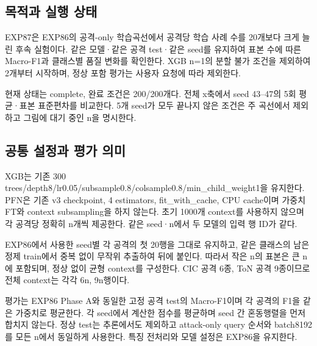 

\subsection{목적과 실행 상태}
EXP87은 EXP86의 공격-only 학습곡선에서 공격당 학습 사례 수를 20개보다 크게 늘린 후속 실험이다. 같은 모델·같은 공격 test·같은 seed를 유지하여 표본 수에 따른 Macro-F1과 클래스별 품질 변화를 확인한다. XGB n=\allowbreak{}1의 분할 불가 조건을 제외하여 2개부터 시작하며, 정상 포함 평가는 사용자 요청에 따라 제외한다.

현재 상태는 complete, 완료 조건은 200/\allowbreak{}200개다. 전체 x축에서 seed 43–47의 5회 평균·표본 표준편차를 비교한다. 5개 seed가 모두 끝나지 않은 조건은 주 곡선에서 제외하고 그림에 대기 중인 n을 명시한다.

\subsection{공통 설정과 평가 의미}
XGB는 기존 300 trees/\allowbreak{}depth8/\allowbreak{}lr0.05/\allowbreak{}subsample0.8/\allowbreak{}colsample0.8/\allowbreak{}min\_\allowbreak{}child\_\allowbreak{}weight1을 유지한다. PFN은 기존 v3 checkpoint, 4 estimators, fit\_\allowbreak{}with\_\allowbreak{}cache, CPU cache이며 가중치 FT와 context subsampling을 하지 않는다. 초기 1000개 context를 사용하지 않으며 각 공격당 정확히 n개씩 제공한다. 같은 seed·n에서 두 모델의 입력 행 ID가 같다.

EXP86에서 사용한 seed별 각 공격의 첫 20행을 그대로 유지하고, 같은 클래스의 남은 정제 train에서 중복 없이 무작위 추출하여 뒤에 붙인다. 따라서 작은 n의 표본은 큰 n에 포함되며, 정상 없이 균형 context를 구성한다. CIC 공격 6종, ToN 공격 9종이므로 전체 context는 각각 6n, 9n행이다.

평가는 EXP86 Phase A와 동일한 고정 공격 test의 Macro-F1이며 각 공격의 F1을 같은 가중치로 평균한다. 각 seed에서 계산한 점수를 평균하며 seed 간 혼동행렬을 먼저 합치지 않는다. 정상 test는 추론에서도 제외하고 attack-only query 순서와 batch8192를 모든 n에서 동일하게 사용한다. 특징 전처리와 모델 설정은 EXP86을 유지한다.


